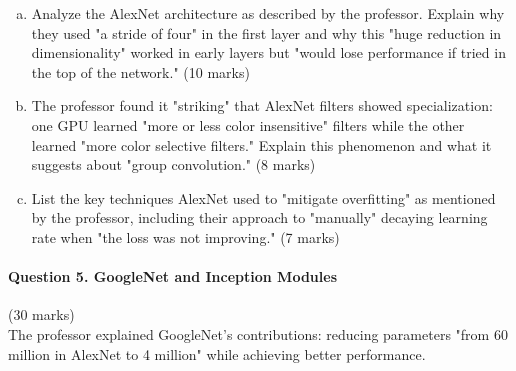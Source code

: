 \documentclass[12pt]{article}
\newcommand{\shortanswer}{\vspace{2cm}}
\newcommand{\mediumanswer}{\vspace{3cm}}
\begin{document}
\begin{enumerate}[(a)]
    \item Analyze the AlexNet architecture as described by the professor. Explain why they used "a stride of four" in the first layer and why this "huge reduction in dimensionality" worked in early layers but "would lose performance if tried in the top of the network." \hfill (10 marks)
    
    \mediumanswer
    
    \item The professor found it "striking" that AlexNet filters showed specialization: one GPU learned "more or less color insensitive" filters while the other learned "more color selective filters." Explain this phenomenon and what it suggests about "group convolution." \hfill (8 marks)
    
    \mediumanswer
    
    \item List the key techniques AlexNet used to "mitigate overfitting" as mentioned by the professor, including their approach to "manually" decaying learning rate when "the loss was not improving." \hfill (7 marks)
    
    \shortanswer
\end{enumerate}

\newpage
\paragraph{Question 5. GoogleNet and Inception Modules}{\hfill (30 marks)}\\
The professor explained GoogleNet's contributions: reducing parameters "from 60 million in AlexNet to 4 million" while achieving better performance.
\end{document}
